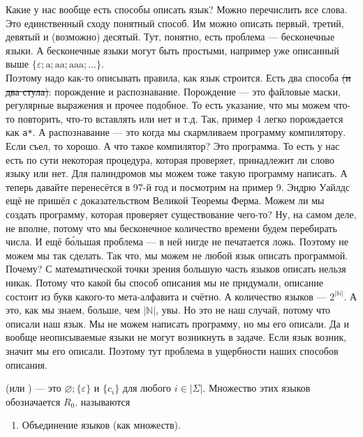 \documentclass{article}
\begin{document}
\begin{itemize}
\begin{Comment}
            Какие у нас вообще есть способы описать язык?
            Можно перечислить все слова. Это единственный сходу понятный способ. Им можно описать первый, третий, девятый и (возможно) десятый. Тут, понятно, есть проблема --- бесконечные языки. А бесконечные языки могут быть простыми, например уже описанный выше $\{\varepsilon;\mathrm a;\mathrm{aa};\mathrm{aaa};\ldots\}$.\\
            Поэтому надо как-то описывать правила, как язык строится. Есть два способа \sout{(и два стула)}: порождение и распознавание. Порождение --- это файловые маски, регулярные выражения и прочее подобное. То есть указание, что мы можем что-то повторить, что-то вставлять или нет и т.д. Так, пример 4 легко порождается как \verb|a|{\color{orange}\verb|*|}. А распознавание --- это когда мы скармливаем программу компилятору. Если съел, то хорошо. А что такое компилятор? Это программа. То есть у нас есть по сути некоторая процедура, которая проверяет, принадлежит ли слово языку или нет. Для палиндромов мы можем тоже такую программу написать. А теперь давайте перенесётся в 97-й год и посмотрим на пример 9. Эндрю Уайлдс ещё не пришёл с доказательством Великой Теоремы Ферма. Можем ли мы создать программу, которая проверяет существование чего-то? Ну, на самом деле, не вполне, потому что мы бесконечное количество времени будем перебирать числа. И ещё б\'{о}льшая проблема --- в ней нигде не печатается ложь. Поэтому не можем мы так сделать. Так что, мы можем не любой язык описать программой.\\
            Почему? С математической точки зрения большую часть языков описать нельзя никак. Потому что какой бы способ описания мы не придумали, описание состоит из букв какого-то мета-алфавита и счётно. А количество языков --- $2^{|\mathbb N|}$. А это, как мы знаем, больше, чем $|\mathbb N|$, увы. Но это не наш случай, потому что описали наш язык. Мы не можем написать программу, но мы его описали. Да и вообще неописываемые языки не могут возникнуть в задаче. Если язык возник, значит мы его описали. Поэтому тут проблема в ущербности наших способов описания.
        \end{Comment}
        \dfn {} (или ) --- это $\varnothing;\{\varepsilon\}$ и $\{c_i\}$ для любого $i\in|\Sigma|$. Множество этих языков обозначается $R_0$.
        \dfn {} называются
        \begin{enumerate}
            \item Объединение языков (как множеств).

\end{enumerate}
\end{itemize}
\end{document}
